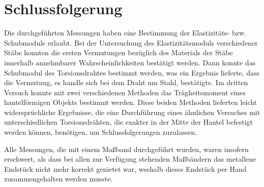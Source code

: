 \documentclass[
	a4paper,
	12pt,
	pagesize,
	ngerman
]{scrartcl}
\begin{document}
	\section{Schlussfolgerung}
	Die durchgeführten Messungen haben eine Bestimmung der Elastizitäts- bzw. Schubmodule erlaubt.
	Bei der Untersuchung des Elastizitätsmoduls verschiedener Stäbe konnten die ersten Vermutungen bezüglich des Materials der Stäbe innerhalb annehmbarer Wahrscheinlichkeiten bestätigt werden.
	Dann konnte das Schubmodul des Torsionsdrahtes bestimmt werden, was ein Ergebnis lieferte, dass die Vermutung, es handle sich bei dem Draht um Stahl, bestätigte.
	Im dritten Versuch konnte mit zwei verschiedenen Methoden das Trägheitsmoment eines hantelförmigen Objekts bestimmt werden.
	Diese beiden Methoden lieferten leicht widersprüchliche Ergebnisse, die eine Durchführung eines ähnlichen Versuches mit unterschiedlichen Torsionsdrähten, die exakter in der Mitte der Hantel befestigt werden können, benötigen, um Schlussfolgerungen zuzulassen. \par
	Alle Messungen, die mit einem Maßband durchgeführt wurden, waren insofern erschwert, als dass bei allen zur Verfügung stehenden Maßbändern das metallene Endstück nicht mehr korrekt genietet war, weshalb dieses Endstück per Hand zusammengehalten werden musste.
	\printbibliography
\end{document}
